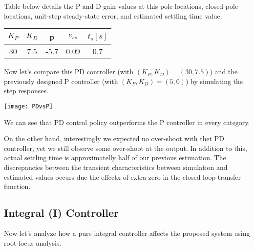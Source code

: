 \documentclass[twoside]{article}
\begin{document}
Table below details the P and D gain values at this pole locations, 
closed-pole locations,  unit-step steady-state error, and estimated
settling time value. 

\vspace{6pt}
\begin{minipage}[h]{1\linewidth}
\begin{center}
\begin{tabular}{|c | c | c | c | c  |}
\hline
$K_P$ &$K_D$ & p & $e_{ss}$ & $t_s [s]$ 
\\ \hline
30 & 7.5& -5.7 & 0.09 & 0.7
\\ \hline
\end{tabular}
\end{center}
\end{minipage}
\vspace{6pt}

Now let's compare this PD controller (with $(K_P,K_D) = (30,7.5)$)
and the previously designed P controller (with $(K_P,K_D) = (5,0)$)
by simulating the step responses. 

\vspace{12 pt}

  \begin{minipage}[h]{1\linewidth}
    \begin{center}
      \texttt{[image: PDvsP]}
    \end{center}
  \end{minipage}

\vspace{12 pt}

We can see that PD control policy outperforms 
the P controller in every category. 

On the other hand, interestingly we expected no over-shoot with
thet PD controller, yet we still observe some over-shoot 
at the output. In addition to this, actual settling 
time is approximatelly half of our previous estimation. 
The discrepancies between the transient characteristics between
simulation and estimated values occurs due the
effectx of extra zero in the closed-loop transfer function. 

\subsection{Integral (I) Controller}

Now let's analyze how a pure integral controller affects 
the proposed system using root-locus analysis. 
\end{document}
